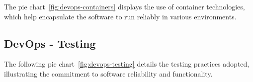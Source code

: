 The pie chart~\ref{fig:devops-containers} displays the use of container technologies, which help encapsulate the software to run reliably in various environments.


\subsection{DevOps - Testing}

The following pie chart~\ref{fig:devops-testing} details the testing practices adopted, illustrating the commitment to software reliability and functionality.



